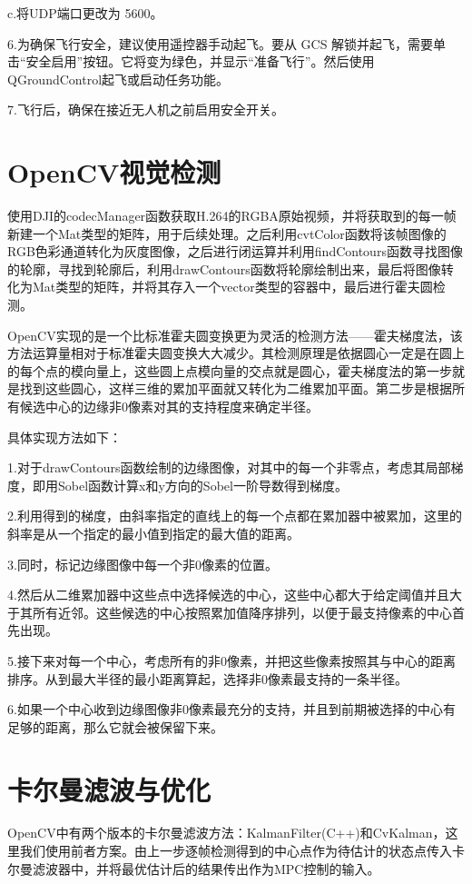 c.将UDP端口更改为 5600。

6.为确保飞行安全，建议使用遥控器手动起飞。要从 GCS 解锁并起飞，需要单击“安全启用”按钮。它将变为绿色，并显示“准备飞行”。然后使用QGroundControl起飞或启动任务功能。

7.飞行后，确保在接近无人机之前启用安全开关。

\section{OpenCV视觉检测}

使用DJI的codecManager函数获取H.264的RGBA原始视频，并将获取到的每一帧新建一个Mat类型的矩阵，用于后续处理。之后利用cvtColor函数将该帧图像的RGB色彩通道转化为灰度图像，之后进行闭运算并利用findContours函数寻找图像的轮廓，寻找到轮廓后，利用drawContours函数将轮廓绘制出来，最后将图像转化为Mat类型的矩阵，并将其存入一个vector类型的容器中，最后进行霍夫圆检测。

OpenCV实现的是一个比标准霍夫圆变换更为灵活的检测方法——霍夫梯度法，该方法运算量相对于标准霍夫圆变换大大减少。其检测原理是依据圆心一定是在圆上的每个点的模向量上，这些圆上点模向量的交点就是圆心，霍夫梯度法的第一步就是找到这些圆心，这样三维的累加平⾯就又转化为二维累加平面。第二步是根据所有候选中心的边缘非0像素对其的支持程度来确定半径。

具体实现方法如下：

1.对于drawContours函数绘制的边缘图像，对其中的每一个非零点，考虑其局部梯度，即用Sobel函数计算x和y方向的Sobel⼀阶导数得到梯度。

2.利用得到的梯度，由斜率指定的直线上的每一个点都在累加器中被累加，这⾥的斜率是从一个指定的最小值到指定的最大值的距离。

3.同时，标记边缘图像中每一个非0像素的位置。

4.然后从二维累加器中这些点中选择候选的中心，这些中心都大于给定阈值并且大于其所有近邻。这些候选的中心按照累加值降序排列，以便于最支持像素的中心首先出现。

5.接下来对每⼀个中心，考虑所有的非0像素，并把这些像素按照其与中心的距离排序。从到最大半径的最小距离算起，选择非0像素最支持的⼀条半径\cite{Art6}。

6.如果⼀个中心收到边缘图像⾮0像素最充分的支持，并且到前期被选择的中心有足够的距离，那么它就会被保留下来。

\section{卡尔曼滤波与优化}

OpenCV中有两个版本的卡尔曼滤波方法：KalmanFilter(C++)和CvKalman，这里我们使用前者方案。由上一步逐帧检测得到的中心点作为待估计的状态点传入卡尔曼滤波器中，并将最优估计后的结果传出作为MPC控制的输入。

